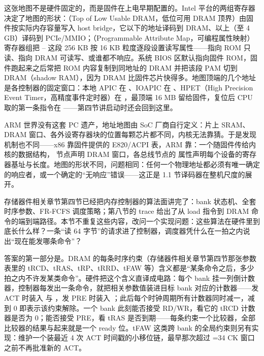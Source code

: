 这张地图不是硬件固定的，而是固件在上电早期配置的。Intel 平台的两组寄存器决定了地图的形状：（Top of Low Usable DRAM，低位可用 DRAM 顶界）由固件按实际内存容量写入 host bridge，它以下的地址译码到 DRAM、以上（至 4 GB）译码到 PCIe/MMIO；（Programmable Attribute Map，可编程属性映射）寄存器组把 -- 这段 256 KB 按 16 KB 粒度逐段设置读写属性——指向 ROM 只读、指向 DRAM 可读写、或谁都不响应。系统 BIOS 区默认指向固件 ROM，固件跑起来之后常把 ROM 内容复制到同地址的 DRAM 并把该段 PAM 切到 DRAM（shadow RAM），因为 DRAM 比固件芯片快得多。地图顶端的几个地址是各控制器的固定窗口：本地 APIC 在 、IOAPIC 在 、HPET（High Precision Event Timer，高精度事件定时器）在 ，最顶端 16 MB 留给固件，复位后 CPU 取的第一条指令在 ——第四节讲启动时还会回到这里。

ARM 世界没有这套 PC 遗产，地址地图由 SoC 厂商自行定义：片上 SRAM、DRAM 窗口、各外设寄存器块的位置每颗芯片都不同，内核无法靠猜。于是发现机制也不同——x86 靠固件提供的 E820/ACPI 表，ARM 靠：一个随固件传给内核的数据结构， 节点声明 DRAM 窗口，各总线节点的  属性声明每个设备的寄存器基址与长度。地图的形状不同，问题相同：任何一个物理地址都必须有唯一确定的响应者，或一个确定的“无响应”错误——这正是 1.1 节译码器在整机尺度的展开。


存储器件相关章节第四节已经把内存控制器的算法面讲完了：bank 状态机、全套时序参数、FR-FCFS 调度策略；第八节的 trace 给出了从 load 指令到 DRAM 命令的端到端路径。本节不重复这些内容，改问一个实现问题：这些算法在硬件里到底长什么样？一条“读 64 字节”的请求进了控制器，调度器凭什么在一拍之内说出“现在能发哪条命令”？

答案的第一部分是。DRAM 的每条时序约束（存储器件相关章节第四节那张参数表里的 tRCD、tRAS、tRP、tRRD、tFAW 等）含义都是“某条命令之后，多少拍之内不许发某类命令”。硬件把这个含义直译成电路：每个 bank 挂一列倒计数器，控制器每发出一条命令，就把相关参数值装进目标 bank 对应的计数器——发 ACT 时装入  与 ，发 PRE 时装入 ；此后每个时钟周期所有计数器同时减一，减到 0 即表示该约束解除。一个 bank 此刻能否接受 RD/WR，看它的 tRCD 计数器是否为 0；能否接受 PRE，看 tRAS 是否到期——每条约束一个比较器，全部比较器的结果与起来就是一个 ready 位。tFAW 这类跨 bank 的全局约束则另有实现：维护一个装最近 4 次 ACT 时间戳的小移位链，最早那次超过 =34 CK 窗口之前不再批准新的 ACT。

